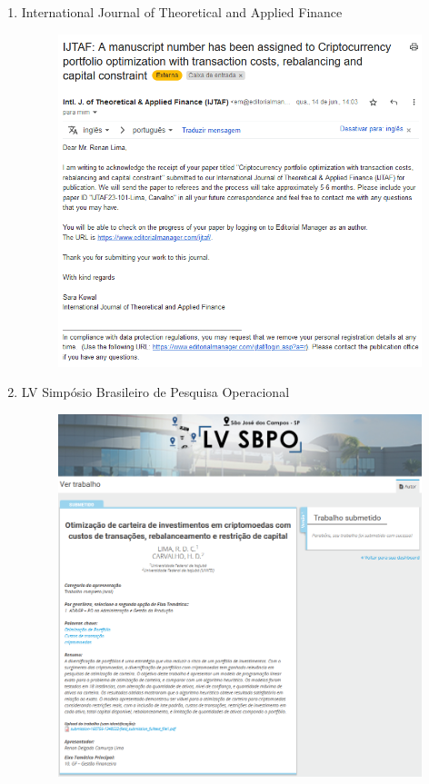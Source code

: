         \begin{enumerate}
            \item International Journal of Theoretical and Applied Finance 
            
                \begin{figure}[htbp]
                    \centering
                    \includegraphics[width=.9\textwidth]{./imagens/ijtaf.png}
                \end{figure}

            \pagebreak
            
            \item LV Simpósio Brasileiro de Pesquisa Operacional
            
                \begin{figure}[htbp]
                    \centering
                    \includegraphics[width=.9\textwidth]{./imagens/sbpo.png}
                \end{figure}

            
        \end{enumerate}

\pagebreak